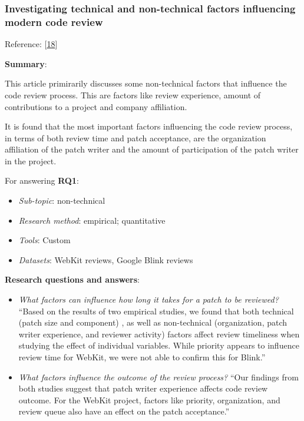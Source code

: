 \documentclass[]{book}
\providecommand{\tightlist}{%
  \setlength{\itemsep}{0pt}\setlength{\parskip}{0pt}}
\begin{document}
\subsubsection{Investigating technical and non-technical factors
influencing modern code
review}\label{investigating-technical-and-non-technical-factors-influencing-modern-code-review}

Reference: {[}\protect\hyperlink{ref-baysal2016investigating}{18}{]}

\textbf{Summary}:

This article primirarily discusses some non-technical factors that
influence the code review process. This are factors like review
experience, amount of contributions to a project and company
affiliation.

It is found that the most important factors influencing the code review
process, in terms of both review time and patch acceptance, are the
organization affiliation of the patch writer and the amount of
participation of the patch writer in the project.

For answering \textbf{RQ1}:

\begin{itemize}
\tightlist
\item
  \emph{Sub-topic}: non-technical
\item
  \emph{Research method}: empirical; quantitative
\item
  \emph{Tools}: Custom
\item
  \emph{Datasets}: WebKit reviews, Google Blink reviews
\end{itemize}

\textbf{Research questions and answers}:

\begin{itemize}
\item
  \emph{What factors can influence how long it takes for a patch to be
  reviewed?} ``Based on the results of two empirical studies, we found
  that both technical (patch size and component) , as well as
  non-technical (organization, patch writer experience, and reviewer
  activity) factors affect review timeliness when studying the effect of
  individual variables. While priority appears to influence review time
  for WebKit, we were not able to confirm this for Blink.''
\item
  \emph{What factors influence the outcome of the review process?} ``Our
  findings from both studies suggest that patch writer experience
  affects code review outcome. For the WebKit project, factors like
  priority, organization, and review queue also have an effect on the
  patch acceptance.''
\end{itemize}
\end{document}
